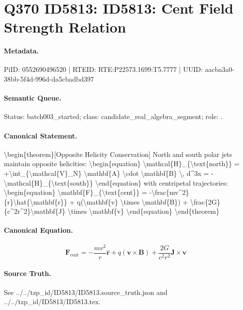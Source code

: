\section*{Q370 ID5813: ID5813: Cent Field Strength Relation}
\paragraph{Metadata.}
PiID: 0552690496520 | RTEID: RTE:P22573.1699:T5.7777 | UUID: aacba3a0-38bb-5f4d-996d-da5cbadbd397

\paragraph{Semantic Queue.}
Status: batch003\_started; class: candidate\_real\_algebra\_segment; role: .

\paragraph{Canonical Statement.}
\textbackslash{}begin\{theorem\}[Opposite Helicity Conservation] North and south polar jets maintain opposite helicities: \textbackslash{}begin\{equation\} \textbackslash{}mathcal\{H\}\_\{\textbackslash{}text\{north\}\} = +\textbackslash{}int\_\{\textbackslash{}mathcal\{V\}\_N\} \textbackslash{}mathbf\{A\} \textbackslash{}cdot \textbackslash{}mathbf\{B\} \textbackslash{}, d\textasciicircum{}3x = -\textbackslash{}mathcal\{H\}\_\{\textbackslash{}text\{south\}\} \textbackslash{}end\{equation\} with centripetal trajectories: \textbackslash{}begin\{equation\} \textbackslash{}mathbf\{F\}\_\{\textbackslash{}text\{cent\}\} = -\textbackslash{}frac\{mv\textasciicircum{}2\}\{r\}\textbackslash{}hat\{\textbackslash{}mathbf\{r\}\} + q(\textbackslash{}mathbf\{v\} \textbackslash{}times \textbackslash{}mathbf\{B\}) + \textbackslash{}frac\{2G\}\{c\textasciicircum{}2r\textasciicircum{}2\}\textbackslash{}mathbf\{J\} \textbackslash{}times \textbackslash{}mathbf\{v\} \textbackslash{}end\{equation\} \textbackslash{}end\{theorem\}

\paragraph{Canonical Equation.}
\[
\begin{equation} \mathbf{F}_{\text{cent}} = -\frac{mv^2}{r}\hat{\mathbf{r}} + q(\mathbf{v} \times \mathbf{B}) + \frac{2G}{c^2r^2}\mathbf{J} \times \mathbf{v} \end{equation}
\]

\paragraph{Source Truth.}
See ../../tzp\_id/ID5813/ID5813.source\_truth.json and ../../tzp\_id/ID5813/ID5813.tex.
